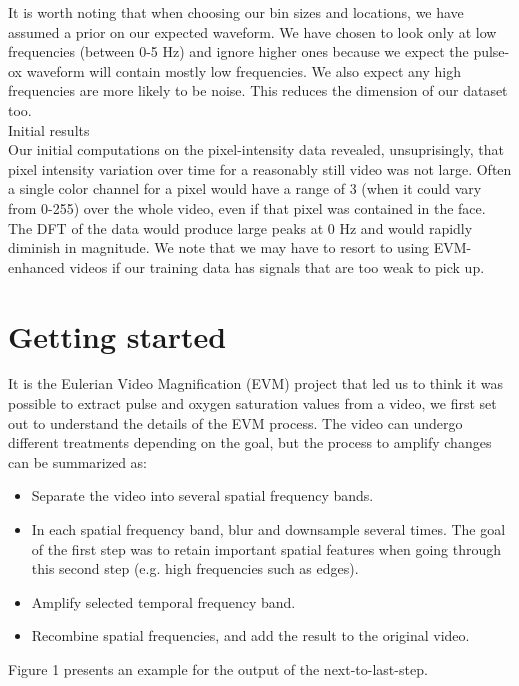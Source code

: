 \documentclass[12pt]{article}
\begin{document}
It is worth noting that when choosing our bin sizes and locations, we have assumed a prior on our expected waveform. 
We have chosen to look only at low frequencies (between 0-5 Hz) and 
ignore higher ones because we expect the pulse-ox waveform will contain  mostly low frequencies.
We also expect any high frequencies are more likely to be noise.
This reduces the dimension of our dataset too.\\

\large Initial results \\
\small Our initial computations on the pixel-intensity data revealed, unsuprisingly,
that pixel intensity variation over time for a reasonably still video was not large.
Often a single color channel for a pixel would have a range of 3 (when it could vary from 0-255) over the whole video, even if that pixel was contained in the face.
The DFT of the data would produce large peaks at 0 Hz and would rapidly diminish in magnitude.
We note that we may have to resort to using EVM-enhanced videos if our training data has signals that are too weak to pick up.


\section{Getting started}

  It is the Eulerian Video Magnification (EVM) project that led us to think it was possible to extract pulse and oxygen saturation values from a video,
  we first set out to understand the details of the EVM process. The video can undergo different treatments depending on the goal, but the process to amplify changes 
  can be summarized as:

  \begin{itemize}
    \item Separate the video into several spatial frequency bands.
    \item In each spatial frequency band, blur and downsample several times. The goal of the first step was to retain important spatial features when going through this second step (e.g. high frequencies such as edges).
    \item Amplify selected temporal frequency band.
    \item Recombine spatial frequencies, and add the result to the original video.
  \end{itemize}
  Figure 1 presents an example for the output of the next-to-last-step. 
\end{document}
